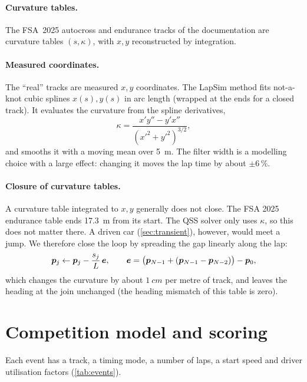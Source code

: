\documentclass[11pt]{article}
\begin{document}
\paragraph{Curvature tables.} The FSA~2025 autocross and endurance tracks of the documentation are curvature
tables $(s, \kappa)$, with $x,y$ reconstructed by integration.

\paragraph{Measured coordinates.} The ``real'' tracks are measured $x,y$ coordinates. The LapSim method fits
not-a-knot cubic splines $x(s), y(s)$ in arc length (wrapped at the ends for a closed track). It evaluates the
curvature from the spline derivatives,
\begin{equation}
\kappa = \frac{x'y'' - y'x''}{(x'^2 + y'^2)^{3/2}},
\end{equation}
and smooths it with a moving mean over \SI{5}{m}. The filter width is a modelling choice with a large effect:
changing it moves the lap time by about $\pm6\,\%$.

\paragraph{Closure of curvature tables.} A curvature table integrated to $x,y$ generally does not close. The FSA
2025 endurance table ends \SI{17.3}{m} from its start. The QSS solver only uses $\kappa$, so this does not matter
there. A driven car (\cref{sec:transient}), however, would meet a jump. We therefore close the loop by spreading the
gap linearly along the lap:
\begin{equation}
\bm{p}_j \leftarrow \bm{p}_j - \frac{s_j}{L}\,\bm{e},\qquad \bm{e} = \big(\bm{p}_{N-1} + (\bm{p}_{N-1}-\bm{p}_{N-2})\big) - \bm{p}_0,
\end{equation}
which changes the curvature by about $\SI{1}{cm}$ per metre of track, and leaves the heading at the join
unchanged (the heading mismatch of this table is zero).

\section{Competition model and scoring}\label{sec:scoring}
Each event has a track, a timing mode, a number of laps, a start speed and driver utilisation factors
(\cref{tab:events}).
\end{document}
